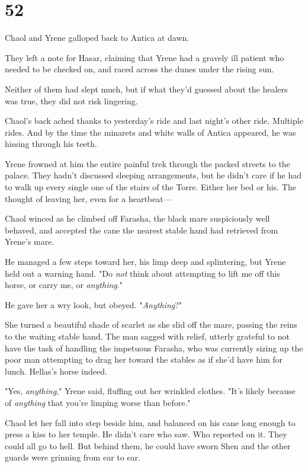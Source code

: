 
\chapter{52}

Chaol and Yrene galloped back to Antica at dawn.

They left a note for Hasar, claiming that Yrene had a gravely ill patient who needed to be checked on, and raced across the dunes under the rising sun.

Neither of them had slept much, but if what they'd guessed about the healers was true, they did not risk lingering.

Chaol's back ached thanks to yesterday's ride and last night's 
other ride.
Multiple rides.
And by the time the minarets and white walls of Antica appeared, he was hissing through his teeth.

Yrene frowned at him the entire painful trek through the packed streets to the palace.
They hadn't discussed sleeping arrangements, but he didn't care if he had to walk up every single one of the stairs of the Torre.
Either her bed or his.
The thought of leaving her, even for a heartbeat---

Chaol winced as he climbed off Farasha, the black mare suspiciously well behaved, and accepted the cane the nearest stable hand had retrieved from Yrene's mare.

He managed a few steps toward her, his limp deep and splintering, but Yrene held out a warning hand.
"Do \emph{not} think about attempting to lift me off this horse, or carry me, or \emph{anything}."

He gave her a wry look, but obeyed.
"\emph{Anything}?"

She turned a beautiful shade of scarlet as she slid off the mare, passing the reins to the waiting stable hand.
The man sagged with relief, utterly grateful to not have the task of handling the impetuous Farasha, who was currently sizing up the poor man attempting to drag her toward the stables as if she'd have him for lunch.
Hellas's horse indeed.

"Yes, \emph{anything}," Yrene said, fluffing out her wrinkled clothes.
"It's likely because of \emph{anything} that you're limping worse than before."

Chaol let her fall into step beside him, and balanced on his cane long enough to press a kiss to her temple.
He didn't care who saw.
Who reported on it.
They could all go to hell.
But behind them, he could have sworn Shen and the other guards were grinning from ear to ear.

